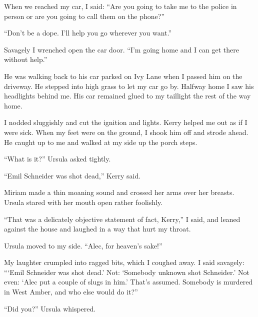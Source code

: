\documentclass{novel}
\begin{document}
When we reached my car, I said: “Are you going to take me to the police in person or are you going to call them on the phone?”

“Don’t be a dope. I’ll help you go wherever you want.”

Savagely I wrenched open the car door. “I’m going home and I can get there without help.”

He was walking back to his car parked on Ivy Lane when I passed him on the driveway. He stepped into high grass to let my car go by. Halfway home I saw his headlights behind me. His car remained glued to my taillight the rest of the way home.

\vspace{2\nbs}
\clearpage
\thispagestyle{empty}


\begin{ChapterStart}
\vspace{3\nbs}
\end{ChapterStart}

I nodded sluggishly and cut the ignition and lights. Kerry helped me out as if I were sick. When my feet were on the ground, I shook him off and strode ahead. He caught up to me and walked at my side up the porch steps.

“What is it?” Ursula asked tightly.

“Emil Schneider was shot dead,” Kerry said.

Miriam made a thin moaning sound and crossed her arms over her breasts. Ursula stared with her mouth open rather foolishly.

“That was a delicately objective statement of fact, Kerry,” I said, and leaned against the house and laughed in a way that hurt my throat.

Ursula moved to my side. “Alec, for heaven’s sake!”

My laughter crumpled into ragged bits, which I coughed away. I said savagely: “‘Emil Schneider was shot dead.’ Not: ‘Somebody unknown shot Schneider.’ Not even: ‘Alec put a couple of slugs in him.’ That’s assumed. Somebody is murdered in West Amber, and who else would do it?”

“Did you?” Ursula whispered.
\end{document}
